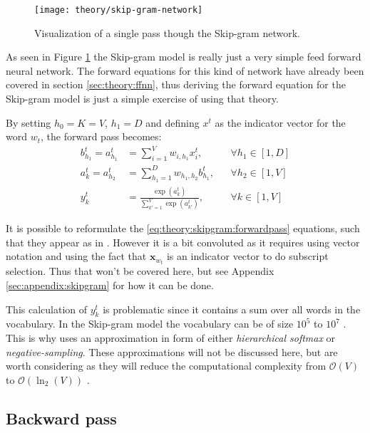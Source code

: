 \begin{figure}[H]
	\centering
	\texttt{[image: theory/skip-gram-network]}
	\caption{Visualization of a single pass though the Skip-gram network.}
	\label{fig:theory:skipgram:network}
\end{figure}

As seen in Figure \ref{fig:theory:skipgram:network} the Skip-gram model is really just a very simple feed forward neural network. The forward equations for this kind of network have already been covered in section \ref{sec:theory:ffnn}, thus deriving the forward equation for the Skip-gram model is just a simple exercise of using that theory. 

By setting $h_0 = K = V$, $h_1 = D$ and defining $x^t$ as the indicator vector for the word $w_t$, the forward pass becomes:
\begin{equation}
\begin{aligned}
b_{h_1}^t = a_{h_1}^t &= \sum_{i = 1}^V w_{i, h_1} x_i^t, && \forall h_1 \in [1, D] \\
a_{k}^t = a_{h_2}^t &= \sum_{h_1 = 1}^{D} w_{h_1, h_2} b_{h_1}^t, && \forall h_2 \in [1, V] \\
y_k^t &= \frac{\exp(a_k^t)}{\sum_{k'=1}^V \exp(a_{k'}^t)}, && \forall k \in [1, V]
\end{aligned}
\label{eq:theory:skipgram:forwardpass}
\end{equation}

It is possible to reformulate the \eqref{eq:theory:skipgram:forwardpass} equations, such that they appear as in \cite{word2vec-details}. However it is a bit convoluted as it requires using vector notation and using the fact that $\mathbf{x}_{w_t}$ is an indicator vector to do subscript selection. Thus that won't be covered here, but see Appendix \ref{sec:appendix:skipgram} for how it can be done.

This calculation of $y_k^t$ is problematic since it contains a sum over all words in the vocabulary. In the Skip-gram model the vocabulary can be of size $10^5$ to $10^7$ \cite{word2vec-details}. This is why \cite{word2vec-comparing, word2vec-details, word2vec-explained} uses an approximation in form of either \textit{hierarchical softmax} or \textit{negative-sampling}. These approximations will not be discussed here, but are worth considering as they will reduce the computational complexity from $\mathcal{O}(V)$ to $\mathcal{O}(\ln_2(V))$ \cite{word2vec-comparing}.

\subsection{Backward pass}

